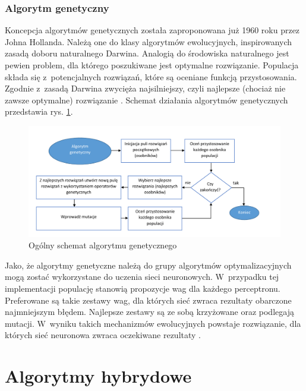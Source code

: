 \documentclass[twoside]{iisthesis}
\begin{document}
	 \subsubsection{Algorytm genetyczny}	
	 		 \label{ss:algorytm_genetyczny}
	 		 
	 		 Koncepcja algorytmów genetycznych została zaproponowana już 1960 roku przez Johna Hollanda. Należą one do klasy algorytmów ewolucyjnych, inspirowanych zasadą doboru naturalnego Darwina. Analogią do środowiska naturalnego jest pewien problem, dla którego poszukiwane jest optymalne rozwiązanie. Populacja składa się z~potencjalnych rozwiązań, które są oceniane funkcją przystosowania. Zgodnie z~zasadą Darwina zwycięża najsilniejszy, czyli najlepsze (chociaż nie zawsze optymalne) rozwiązanie \cite{pena2000evolutionary}. Schemat działania algorytmów genetycznych przedstawia rys. \ref{fig:algorytmgenetyczny}.	 
	 		 
	 		 
	 		 \begin{figure}[!ht] 
	 		 	\centering
	 		 	\includegraphics[width=1\textwidth]{algorytmgenetyczny}
	 		 	\caption{Ogólny schemat algorytmu genetycznego}
	 		 	\label{fig:algorytmgenetyczny}
	 		 \end{figure}
	 		 
	 		 Jako, że algorytmy genetyczne należą do grupy algorytmów optymalizacyjnych mogą zostać wykorzystane do uczenia sieci neuronowych. W~przypadku tej implementacji populację stanowią propozycje wag dla każdego perceptronu. Preferowane są takie zestawy wag, dla których sieć zwraca rezultaty obarczone najmniejszym błędem. Najlepsze zestawy są ze sobą krzyżowane oraz podlegają mutacji. W~wyniku takich mechanizmów ewolucyjnych powstaje rozwiązanie, dla których sieć neuronowa zwraca oczekiwane rezultaty \cite{aforgenetgenetic,montana1989training}.
	 		 
	 
	 \section{Algorytmy hybrydowe}
	 \label{s:algorytmyhybrydowe}
\end{document}
